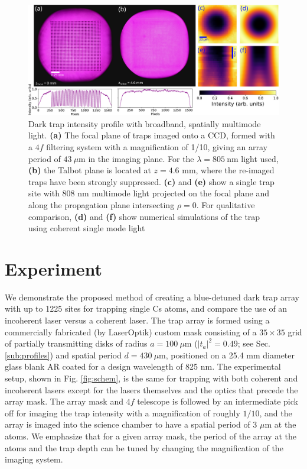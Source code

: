 \begin{figure}[!t]
    \centering
    \includegraphics[width=1\textwidth]{Images/figure3.eps}
    \caption{Dark trap intensity profile with broadband, spatially multimode light. \textbf{(a)} The focal plane of traps imaged onto a CCD, formed with a $4f$ filtering system with a magnification of 1/10, giving an array period of $43~\mu$m in the imaging plane. For the $\lambda= 805~ $nm light used, \textbf{(b)} the Talbot plane is located at $z=4.6$ mm, where the re-imaged traps have been strongly suppressed. \textbf{(c)} and \textbf{(e)} show a single trap site with 808 nm multimode light projected on the focal plane and along the propagation plane intersecting $\rho=0$. For qualitative comparison, \textbf{(d)} and \textbf{(f)} show numerical simulations of the trap using coherent single mode light}
    \label{fig:trap_intensity}
\end{figure}

\section{Experiment} \label{sec:exp}

We demonstrate the proposed method of creating a blue-detuned dark trap array with up to 1225 sites for trapping single Cs atoms, and compare the use of an incoherent laser versus a coherent laser. The trap array is formed using a commercially fabricated (by LaserOptik) custom mask consisting of a $35 \times 35$ grid of partially transmitting disks of radius  $a=100~\mu$m ($|t_a|^2 = 0.49$; see Sec. \ref{sub:profiles}) and spatial period $d=430~\mu \textrm{m}$, positioned on a 25.4 mm diameter glass blank AR coated for a design wavelength of 825 nm. The experimental setup, shown in Fig. \ref{fig:schem}, is the same for trapping with both coherent and incoherent lasers except for the lasers themselves and the optics that precede the array mask. The array mask and $4f$ telescope is followed by an intermediate pick off for imaging the trap intensity with a magnification of roughly $1/10$, and the array is imaged into the science chamber to have a spatial period of 3 $\mu \mathrm{m}$ at the atoms. We emphasize that for a given array mask, the period of the array at the atoms and the trap depth can be tuned by changing the magnification of the imaging system.

